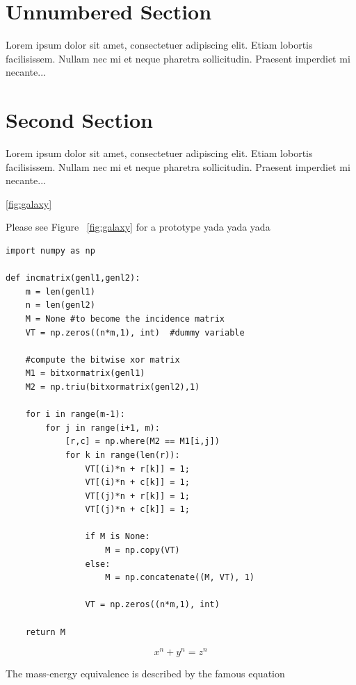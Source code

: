 \documentclass{article}
\begin{document}
\section*{Unnumbered Section}

Lorem ipsum dolor sit amet, consectetuer adipiscing elit.  
Etiam lobortis facilisissem.  Nullam nec mi et neque pharetra 
sollicitudin.  Praesent imperdiet mi necante...

\section{Second Section}
       
Lorem ipsum dolor sit amet, consectetuer adipiscing elit.  
Etiam lobortis facilisissem.  Nullam nec mi et neque pharetra 
sollicitudin.  Praesent imperdiet mi necante...
  
\ref{fig:galaxy}

Please see Figure ~\ref{fig:galaxy} for a prototype yada yada yada
       
       
       
       
\begin{lstlisting}
import numpy as np
    
def incmatrix(genl1,genl2):
    m = len(genl1)
    n = len(genl2)
    M = None #to become the incidence matrix
    VT = np.zeros((n*m,1), int)  #dummy variable
    
    #compute the bitwise xor matrix
    M1 = bitxormatrix(genl1)
    M2 = np.triu(bitxormatrix(genl2),1) 

    for i in range(m-1):
        for j in range(i+1, m):
            [r,c] = np.where(M2 == M1[i,j])
            for k in range(len(r)):
                VT[(i)*n + r[k]] = 1;
                VT[(i)*n + c[k]] = 1;
                VT[(j)*n + r[k]] = 1;
                VT[(j)*n + c[k]] = 1;
                
                if M is None:
                    M = np.copy(VT)
                else:
                    M = np.concatenate((M, VT), 1)
                
                VT = np.zeros((n*m,1), int)
    
    return M
\end{lstlisting}
       
       
       
       
\[ x^n + y^n = z^n \]

The mass-energy equivalence is described by the famous equation
\end{document}
